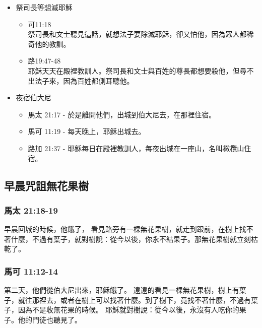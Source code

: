 \begin{itemize}
\begin{itemize}
\end{itemize}
\item 祭司長等想滅耶穌\\
\begin{itemize}
\item 可11:18 \\祭司長和文士聽見這話，就想法子要除滅耶穌，卻又怕他，因為眾人都稀奇他的教訓。
\item 路19:47-48 \\耶穌天天在殿裡教訓人。祭司長和文士與百姓的尊長都想要殺他，但尋不出法子來，因為百姓都側耳聽他。
\end{itemize}

\item 夜宿伯大尼\\
\begin{itemize}
\item 馬太 21:17 - 於是離開他們，出城到伯大尼去，在那裡住宿。
\item 馬可 11:19 - 每天晚上，耶穌出城去。
\item 路加 21:37 - 耶穌每日在殿裡教訓人，每夜出城在一座山，名叫橄欖山住宿。
\end{itemize}
\end{itemize}

\subsection{早晨咒詛無花果樹}
\subsubsection{馬太 21:18-19}
早晨回城的時候，他餓了，
看見路旁有一棵無花果樹，就走到跟前，在樹上找不著什麼，不過有葉子，就對樹說：從今以後，你永不結果子。那無花果樹就立刻枯乾了。
\subsubsection{馬可 11:12-14}
第二天，他們從伯大尼出來，耶穌餓了。
遠遠的看見一棵無花果樹，樹上有葉子，就往那裡去，或者在樹上可以找著什麼。到了樹下，竟找不著什麼，不過有葉子，因為不是收無花果的時候。
耶穌就對樹說：從今以後，永沒有人吃你的果子。他的門徒也聽見了。
